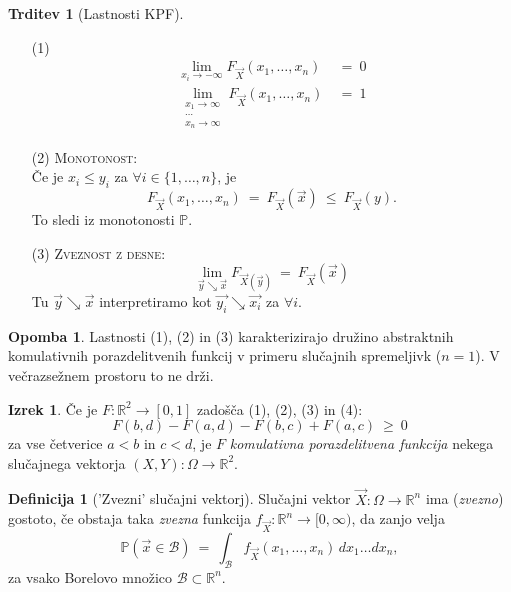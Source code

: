 \documentclass[11pt]{article}
\newcommand{\1}{\mathbbm{1}}
\theoremstyle{definition}
\newtheorem{definicija}{Definicija}[section]
\theoremstyle{definition}
\newtheorem{trditev}{Trditev}[section]
\theoremstyle{definition}
\newtheorem{izrek}{Izrek}[section]
\newtheorem*{opomba}{Opomba}
\begin{document}
\begin{trditev}[Lastnosti KPF]
~
\begin{enumerate}

	\item[(1)] \begin{align*}
		\lim_{x_i \rightarrow -\infty} F_{\vec{X}}(x_1, \ldots, x_n) ~&=~ 0 \\
		\lim_{\substack{x_1 \rightarrow \infty \\ \cdots \\ x_n \rightarrow \infty}} F_{\vec{X}}(x_1, \ldots, x_n) ~&=~ 1 
		\end{align*}
	
	\item[(2)] \textsc{Monotonost}: \\Če je $x_i \leq y_i$ za $\forall i \in \{ 1,\ldots, n \}$, je
	$$F_{\vec{X}}(x_1, \ldots, x_n) ~=~ F_{\vec{X}}(\vec{x}) ~\leq~ F_{\vec{X}}(y).$$
	To sledi iz monotonosti $\mathbb{P}$.
	
	\item[(3)] \textsc{Zveznost z desne}:
	$$\lim_{\vec{y} \searrow \vec{x}} F_{\vec{X}(\vec{y})} ~=~ F_{\vec{X}}(\vec{x})$$
	Tu $\vec{y} \searrow \vec{x}$ interpretiramo kot $\vec{y_i} \searrow \vec{x_i}$ za $\forall i$.
	
\end{enumerate}
\end{trditev}
\vspace{0.5cm}

\begin{opomba}

Lastnosti (1), (2) in (3) karakterizirajo družino abstraktnih komulativnih porazdelitvenih funkcij v primeru slučajnih spremeljivk ($n=1$). V večrazsežnem prostoru to ne drži.

\end{opomba}
\vspace{0.5cm}

\begin{izrek}

Če je $F: \mathbb{R}^2 \rightarrow [0, 1]$ zadošča (1), (2), (3) in (4): 
$$F(b, d) - F(a, d) - F(b, c) + F(a, c) ~\geq~ 0$$
za vse četverice $a < b$ in $c < d$, je $F$ \textit{komulativna porazdelitvena funkcija} nekega slučajnega vektorja $(X, Y): \Omega \rightarrow \mathbb{R}^2$.

\end{izrek}
\vspace{0.5cm}

\begin{definicija}['Zvezni' slučajni vektorj]

Slučajni vektor $\vec{X}: \Omega \rightarrow \mathbb{R}^n$ ima (\textit{zvezno}) gostoto, če obstaja taka \textit{zvezna} funkcija $f_{\vec{X}}: \mathbb{R}^n \rightarrow [0, \infty)$, da zanjo velja
$$\mathbb{P}(\vec{x} \in \mathcal{B}) ~=~ \int_{\mathcal{B}} f_{\vec{X}}(x_1, \ldots, x_n)\,dx_1 \ldots dx_n,$$ 
za vsako Borelovo množico $\mathcal{B} \subset \mathbb{R}^n$.

\end{definicija}
\vspace{0.5cm}
\end{document}

